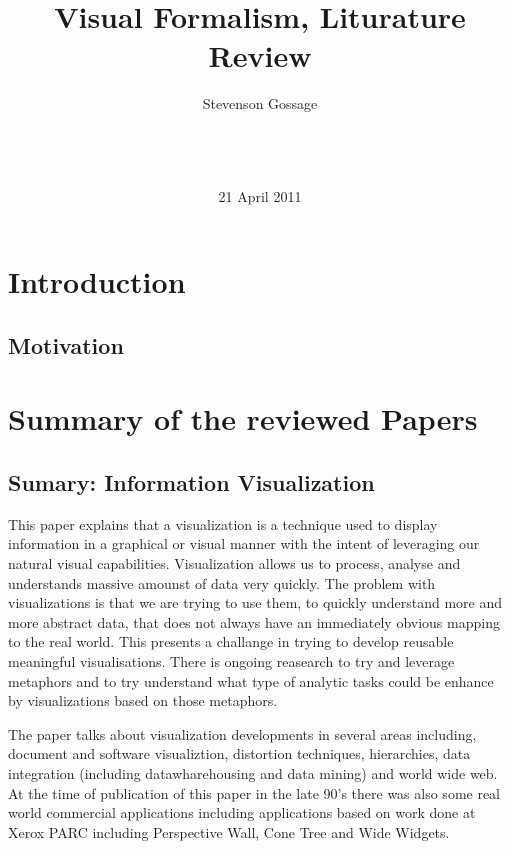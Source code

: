\documentclass{sig-alternate}
\begin{document}
\title{Visual Formalism, Liturature Review}
\author{
\alignauthor
Stevenson Gossage\\
       \\
       \\
       \\
}
\date{21 April 2011}

\maketitle



\section{Introduction}
\subsection{Motivation}
\section{Summary of the reviewed Papers}
\subsection{Sumary: Information Visualization\cite{Gershon:1998:Informationvisualization}}
This paper explains that a visualization is a technique used to display
information in a graphical or visual manner with the intent of leveraging our 
natural visual capabilities. Visualization allows us to process, analyse and
understands massive amounst of data very quickly. The problem with
visualizations is that we are trying to use them, to quickly understand more and
more abstract data, that does not always have an immediately obvious mapping to
the real world. This presents a challange in trying to develop reusable
meaningful visualisations. There is ongoing reasearch to try and leverage
metaphors and to try understand what type of analytic tasks could be enhance by
visualizations based on those metaphors.

The paper talks about visualization developments in several areas including,
document and software visualiztion, distortion techniques, hierarchies, data
integration (including datawharehousing and data mining) and world wide web. 
At the time of publication of this paper in the late 90's there was also some
real world commercial applications including applications based on work done at
Xerox PARC including Perspective Wall, Cone Tree and Wide Widgets.
\end{document}
